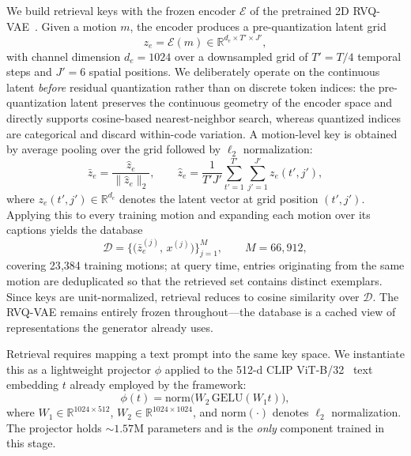 \noindent {}
We build retrieval keys with the frozen encoder $\mathcal{E}$ of the pretrained 2D RVQ-VAE~\cite{mogents}. Given a motion $m$, the encoder produces a pre-quantization latent grid
\begin{equation}
z_e = \mathcal{E}(m) \in \mathbb{R}^{d_e \times T' \times J'},
\end{equation}
with channel dimension $d_e = 1024$ over a downsampled grid of $T' = T/4$ temporal steps and $J' = 6$ spatial positions. We deliberately operate on the continuous latent \emph{before} residual quantization rather than on discrete token indices: the pre-quantization latent preserves the continuous geometry of the encoder space and directly supports cosine-based nearest-neighbor search, whereas quantized indices are categorical and discard within-code variation. A motion-level key is obtained by average pooling over the grid followed by $\ell_2$ normalization:
\begin{equation}
\bar{z}_e
=
\frac{\hat{z}_e}{\|\hat{z}_e\|_2},
\qquad
\hat{z}_e
=
\frac{1}{T' J'}
\sum_{t'=1}^{T'}
\sum_{j'=1}^{J'}
z_e(t', j'),
\end{equation}
where $z_e(t', j') \in \mathbb{R}^{d_e}$ denotes the latent vector at grid position $(t', j')$. Applying this to every training motion and expanding each motion over its captions yields the database
\begin{equation}
\mathcal{D}
=
\big\{ \big( \bar{z}_e^{(j)},\, x^{(j)} \big) \big\}_{j=1}^{M},
\qquad
M = 66{,}912,
\end{equation}
covering 23{,}384 training motions; at query time, entries originating from the same motion are deduplicated so that the retrieved set contains distinct exemplars. Since keys are unit-normalized, retrieval reduces to cosine similarity over $\mathcal{D}$. The RVQ-VAE remains entirely frozen throughout---the database is a cached view of representations the generator already uses.

\noindent {}
Retrieval requires mapping a text prompt into the same key space. We instantiate this as a lightweight projector $\phi$ applied to the 512-d CLIP ViT-B/32~\cite{clip} text embedding $t$ already employed by the framework:
\begin{equation}
\phi(t)
=
\mathrm{norm}\big( W_2\, \mathrm{GELU}( W_1 t ) \big),
\end{equation}
where $W_1 \in \mathbb{R}^{1024 \times 512}$, $W_2 \in \mathbb{R}^{1024 \times 1024}$, and $\mathrm{norm}(\cdot)$ denotes $\ell_2$ normalization. The projector holds ${\sim}1.57$M parameters and is the \emph{only} component trained in this stage.

